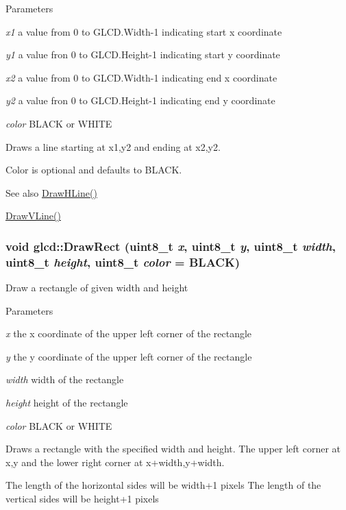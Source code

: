\begin{DoxyParams}{Parameters}
\item[{\em x1}]a value from 0 to GLCD.Width-\/1 indicating start x coordinate \item[{\em y1}]a value fron 0 to GLCD.Height-\/1 indicating start y coordinate \item[{\em x2}]a value from 0 to GLCD.Width-\/1 indicating end x coordinate \item[{\em y2}]a value fron 0 to GLCD.Height-\/1 indicating end y coordinate \item[{\em color}]BLACK or WHITE\end{DoxyParams}
Draws a line starting at x1,y2 and ending at x2,y2.

Color is optional and defaults to BLACK.

\begin{DoxySeeAlso}{See also}
\hyperlink{classglcd_ad44a983103e20535558b69ba15504493}{DrawHLine()} 

\hyperlink{classglcd_a93adb4256767b495b15fb326d6d2c01a}{DrawVLine()} 
\end{DoxySeeAlso}
\hypertarget{classglcd_adbbbba35a6019a7b050e6234619446c0}{
\subsubsection[{DrawRect}]{\setlength{\rightskip}{0pt plus 5cm}void glcd::DrawRect (uint8\_\-t {\em x}, \/  uint8\_\-t {\em y}, \/  uint8\_\-t {\em width}, \/  uint8\_\-t {\em height}, \/  uint8\_\-t {\em color} = {\ttfamily BLACK})}}
\label{classglcd_adbbbba35a6019a7b050e6234619446c0}
Draw a rectangle of given width and height


\begin{DoxyParams}{Parameters}
\item[{\em x}]the x coordinate of the upper left corner of the rectangle \item[{\em y}]the y coordinate of the upper left corner of the rectangle \item[{\em width}]width of the rectangle \item[{\em height}]height of the rectangle \item[{\em color}]BLACK or WHITE\end{DoxyParams}
Draws a rectangle with the specified width and height. The upper left corner at x,y and the lower right corner at x+width,y+width.

The length of the horizontal sides will be width+1 pixels The length of the vertical sides will be height+1 pixels

